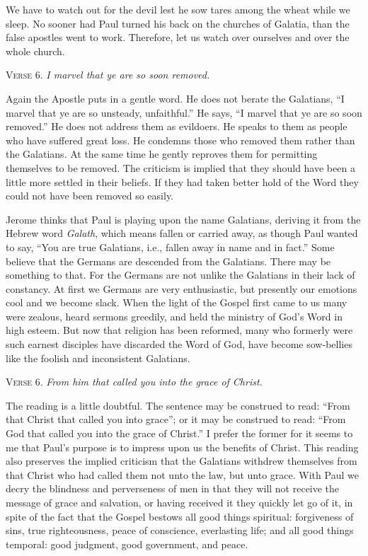 We have to watch out for the devil lest he sow tares among the wheat while we sleep. No sooner had Paul turned his back on the churches of Galatia, than the false apostles went to work. Therefore, let us watch over ourselves and over the whole church.

\textsc{Verse} 6. \emph{I marvel that ye are so soon removed.}

Again the Apostle puts in a gentle word. He does not berate the Galatians, “I marvel that ye are so unsteady, unfaithful.” He says, “I marvel that ye are so soon removed.” He does not address them as evildoers. He speaks to them as people who have suffered great loss. He condemns those who removed them rather than the Galatians. At the same time he gently reproves them for permitting themselves to be removed. The criticism is implied that they should have been a little more settled in their beliefs. If they had taken better hold of the Word they could not have been removed so easily.

Jerome thinks that Paul is playing upon the name Galatians, deriving it from the Hebrew word \emph{Galath}, which means fallen or carried away, as though Paul wanted to say, “You are true Galatians, i.e., fallen away in name and in fact.” Some believe that the Germans are descended from the Galatians. There may be something to that. For the Germans are not unlike the Galatians in their lack of constancy. At first we Germans are very enthusiastic, but presently our emotions cool and we become slack. When the light of the Gospel first came to us many were zealous, heard sermons greedily, and held the ministry of God’s Word in high esteem. But now that religion has been reformed, many who formerly were such earnest disciples have discarded the Word of God, have become sow-bellies like the foolish and inconsistent Galatians.

\textsc{Verse} 6. \emph{From him that called you into the grace of Christ.}

The reading is a little doubtful. The sentence may be construed to read: “From that Christ that called you into grace”; or it may be construed to read: “From God that called you into the grace of Christ.” I prefer the former for it seems to me that Paul’s purpose is to impress upon us the benefits of Christ. This reading also preserves the implied criticism that the Galatians withdrew themselves from that Christ who had called them not unto the law, but unto grace. With Paul we decry the blindness and perverseness of men in that they will not receive the message of grace and salvation, or having received it they quickly let go of it, in spite of the fact that the Gospel bestows all good things spiritual: forgiveness of sins, true righteousness, peace of conscience, everlasting life; and all good things temporal: good judgment, good government, and peace.

